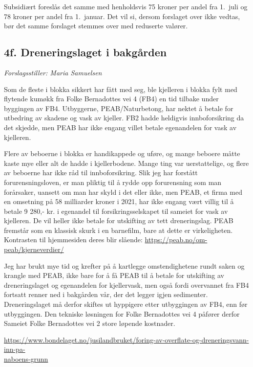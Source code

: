 \documentclass[12pt]{article}
\begin{document}
Subsidiært foreslås det samme med henholdsvis 75 kroner per andel fra 1.\ juli og 78 kroner per
andel fra 1.\ januar. Det vil si, dersom forslaget over ikke vedtas, bør det samme forslaget
stemmes over med reduserte valører.

\subsection*{4f. Dreneringslaget i bakgården}

{\em Forslagsstiller: Maria Samuelsen}

Som de fleste i blokka sikkert har fått med seg, ble kjelleren i blokka fylt med flytende kumøkk fra
Folke Bernadottes vei 4 (FB4) en tid tilbake under byggingen av FB4. Utbyggerne,
PEAB/Naturbetong, har nektet å betale for utbedring av skadene og vask av kjeller. FB2 hadde
heldigvis innboforsikring da det skjedde, men PEAB har ikke engang villet betale egenandelen for
vask av kjelleren.

Flere av beboerne i blokka er handikappede og uføre, og mange beboere måtte kaste mye eller alt de
hadde i kjellerbodene. Mange ting var uerstattelige, og flere av beboerne har ikke råd til
innboforsikring. Slik jeg har forstått forurensningsloven, er man pliktig til å rydde opp forurensning
som man forårsaker, uansett om man har skyld i det eller ikke, men PEAB, et firma med en
omsetning på 58 milliarder kroner i 2021, har ikke engang vært villig til å betale 9 280,- kr. i
egenandel til forsikringsselskapet til sameiet for vask av kjelleren. De vil heller ikke betale for
utskifting av tett dreneringslag. PEAB fremstår som en klassisk skurk i en barnefilm, bare at dette er
virkeligheten. Kontrasten til hjemmesiden deres blir slående: \href{https://peab.no/om-peab/kjerneverdier/}{https://peab.no/om-peab/kjerneverdier/}

Jeg har brukt mye tid og krefter på å kartlegge omstendighetene rundt saken og krangle med PEAB,
ikke bare for å få PEAB til å betale for utskifting av dreneringslaget og egenandelen for kjellervask,
men også fordi overvannet fra FB4 fortsatt renner ned i bakgården vår, der det legger igjen
sedimenter. Dreneringslaget må derfor skiftes ut hyppigere etter utbyggingen av FB4, enn før
utbyggingen. Den tekniske løsningen for Folke Bernadottes vei 4 påfører derfor Sameiet Folke
Bernadottes vei 2 store løpende kostnader.

\href{https://www.bondelaget.no/jusilandbruket/foring-av-overflate-og-dreneringsvann-inn-pa-naboens-grunn}{https://www.bondelaget.no/jusilandbruket/foring-av-overflate-og-dreneringsvann-inn-pa-\\naboens-grunn}
\end{document}

